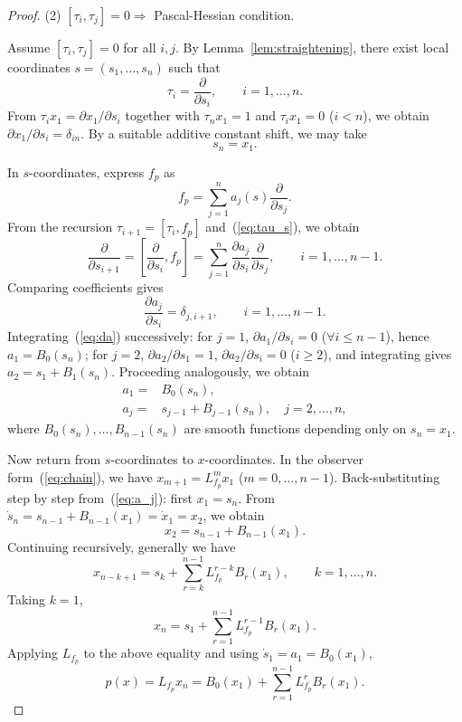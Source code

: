 \documentclass[10pt,a4paper]{amsart}
\begin{document}
\begin{proof}
	\medskip
	\noindent (2) $[\tau_i,\tau_j]=0\Rightarrow$ Pascal-Hessian condition.

	Assume $[\tau_i,\tau_j]=0$ for all $i,j$. By Lemma~\ref{lem:straightening}, there exist local coordinates $s=(s_1,\ldots,s_n)$ such that
	\begin{equation}\label{eq:tau_s}
		\tau_i=\frac{\partial}{\partial s_i},\qquad i=1,\ldots,n.
	\end{equation}
	From $\tau_i x_1=\partial x_1/\partial s_i$ together with $\tau_n x_1=1$ and $\tau_i x_1=0$ ($i<n$), we obtain $\partial x_1/\partial s_i=\delta_{in}$. By a suitable additive constant shift, we may take
	\begin{equation}\label{eq:sn_x1}
		s_n=x_1.
	\end{equation}

	In $s$-coordinates, express $f_p$ as
	\[
	f_p=\sum_{j=1}^n a_j(s)\frac{\partial}{\partial s_j}.
	\]
	From the recursion $\tau_{i+1}=[\tau_i,f_p]$ and~(\ref{eq:tau_s}), we obtain
	\[
	\frac{\partial}{\partial s_{i+1}}=\left[\frac{\partial}{\partial s_i},f_p\right]=\sum_{j=1}^n\frac{\partial a_j}{\partial s_i}\frac{\partial}{\partial s_j},\qquad i=1,\ldots,n-1.
	\]
	Comparing coefficients gives
	\begin{equation}\label{eq:da}
		\frac{\partial a_j}{\partial s_i}=\delta_{j,i+1},\qquad i=1,\ldots,n-1.
	\end{equation}
	Integrating~(\ref{eq:da}) successively: for $j=1$, $\partial a_1/\partial s_i=0$ ($\forall i\leq n-1$), hence $a_1=B_0(s_n)$; for $j=2$, $\partial a_2/\partial s_1=1$, $\partial a_2/\partial s_i=0$ ($i\geq2$), and integrating gives $a_2=s_1+B_1(s_n)$. Proceeding analogously, we obtain
	\begin{align}
		a_1=&B_0(s_n),\\
		a_j=&s_{j-1}+B_{j-1}(s_n),\quad j=2,\ldots,n,\label{eq:a_j}
	\end{align}
	where $B_0(s_n),\ldots,B_{n-1}(s_n)$ are smooth functions depending only on $s_n=x_1$.

	Now return from $s$-coordinates to $x$-coordinates. In the observer form~(\ref{eq:chain}), we have $x_{m+1}=L_{f_p}^m x_1$ ($m=0,\ldots,n-1$). Back-substituting step by step from~(\ref{eq:a_j}): first $x_1=s_n$. From $\dot{s}_n=s_{n-1}+B_{n-1}(x_1)=\dot{x}_1=x_2$, we obtain
	\[
	x_2=s_{n-1}+B_{n-1}(x_1).
	\]
	Continuing recursively, generally we have
	\begin{equation}\label{eq:x2s_inv}
		x_{n-k+1}=s_k+\sum_{r=k}^{n-1}L_{f_p}^{r-k}B_r(x_1),\qquad k=1,\ldots,n.
	\end{equation}
	Taking $k=1$,
	\[
	x_n=s_1+\sum_{r=1}^{n-1}L_{f_p}^{r-1}B_r(x_1).
	\]
	Applying $L_{f_p}$ to the above equality and using $\dot{s}_1=a_1=B_0(x_1)$,
	\begin{equation}\label{eq:p_Lf}
		p(x)=L_{f_p}x_n=B_0(x_1)+\sum_{r=1}^{n-1}L_{f_p}^r B_r(x_1).
	\end{equation}


\end{proof}
\end{document}
